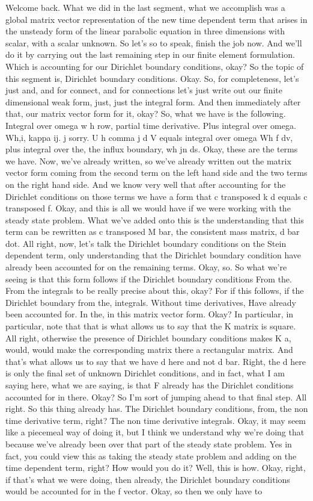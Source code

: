 \documentclass[10pt]{article}
\begin{document}
Welcome back. What we did in the last segment, what we accomplish was a global matrix vector representation of the new time dependent term that arises in the unsteady form of the linear parabolic equation in three dimensions with scalar, with a scalar unknown. So let's so to speak, finish the job now. And we'll do it by carrying out the last remaining step in our finite element formulation. Which is accounting for our Dirichlet boundary conditions, okay? So the topic of this segment is, Dirichlet boundary conditions. Okay. So, for completeness, let's just and, and for connect, and for connections let's just write out our finite dimensional weak form, just, just the integral form. And then immediately after that, our matrix vector form for it, okay? So, what we have is the following. Integral over omega w h row, partial time derivative. Plus integral over omega. Wh,i, kappa ij. j sorry. U h comma j d V equals integral over omega Wh f dv, plus integral over the, the influx boundary, wh jn ds. Okay, these are the terms we have. Now, we've already written, so we've already written out the matrix vector form coming from the second term on the left hand side and the two terms on the right hand side. And we know very well that after accounting for the Dirichlet conditions on those terms we have a form that c transposed k d equals c transposed f. Okay, and this is all we would have if we were working with the steady state problem. What we've added onto this is the understanding that this term can be rewritten as c transposed M bar, the consistent mass matrix, d bar dot. All right, now, let's talk the Dirichlet boundary conditions on the Stein dependent term, only understanding that the Dirichlet boundary condition have already been accounted for on the remaining terms. Okay, so. So what we're seeing is that this form follows if the Dirichlet boundary conditions From the. From the integrals to be really precise about this, okay? For if this follows, if the Dirichlet boundary from the, integrals. Without time derivatives, Have already been accounted for. In the, in this matrix vector form.  Okay? In particular, in particular, note that that is what allows us to say that the K matrix is square. All right, otherwise the presence of Dirichlet boundary conditions makes K a, would, would make the corresponding matrix there a rectangular matrix. And that's what allows us to say that we have d here and not d bar. Right, the d here is only the final set of unknown Dirichlet conditions, and in fact, what I am saying here, what we are saying, is that F already has the Dirichlet conditions accounted for in there. Okay? So I'm sort of jumping ahead to that final step. All right. So this thing already has. The Dirichlet boundary conditions, from, the non time derivative term, right? The non time derivative integrals. Okay, it may seem like a piecemeal way of doing it, but I think we understand why we're doing that because we've already been over that part of the steady state problem. Yes in fact, you could view this as taking the steady state problem and adding on the time dependent term, right? How would you do it? Well, this is how. Okay, right, if that's what we were doing, then already, the Dirichlet boundary conditions would be accounted for in the f vector. Okay, so then we only have to 
\end{document}
